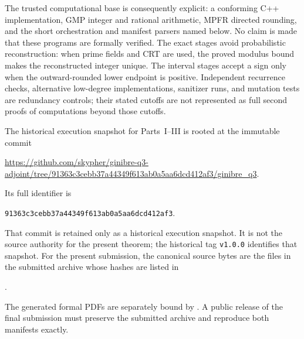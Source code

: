 \documentclass[11pt,reqno]{amsart}
\theoremstyle{plain}
\theoremstyle{definition}
\begin{document}
The trusted computational base is consequently explicit: a conforming C++
implementation, GMP integer and rational arithmetic, MPFR directed rounding,
and the short orchestration and manifest parsers named below.  No claim is
made that these programs are formally verified.  The exact stages avoid
probabilistic reconstruction: when prime fields and CRT are used, the proved
modulus bound makes the reconstructed integer unique.  The interval stages
accept a sign only when the outward-rounded lower endpoint is positive.
Independent recurrence checks, alternative low-degree implementations,
sanitizer runs, and mutation tests are redundancy controls; their stated
cutoffs are not represented as full second proofs of computations beyond
those cutoffs.

The historical execution snapshot for Parts~I--III is rooted at the immutable
commit
\begin{center}
\url{https://github.com/skypher/ginibre-q3-adjoint/tree/91363c3cebb37a44349f613ab0a5aa6dcd412af3/ginibre_q3}.
\end{center}
Its full identifier is
\begin{center}
\texttt{91363c3cebb37a44349f613ab0a5aa6dcd412af3}.
\end{center}
That commit is retained only as a historical execution snapshot.  It is not
the source authority for the present theorem; the historical tag
\texttt{v1.0.0} identifies that snapshot.  For the present submission,
the canonical source bytes are the files in the submitted archive whose
hashes are listed in
\begin{center}
\small{}.
\end{center}
The generated
formal PDFs are separately bound by .
A public release of the final submission must preserve the submitted archive
and reproduce both manifests exactly.
\end{document}

